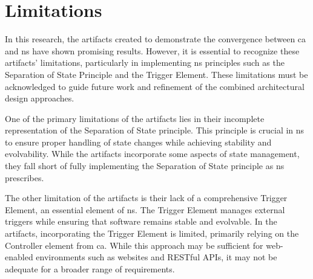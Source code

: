 \section{Limitations}

In this research, the artifacts created to demonstrate the convergence between \gls{ca}
and \gls{ns} have shown promising results. However, it is essential to recognize these
artifacts' limitations, particularly in implementing \gls{ns} principles such as the
Separation of State Principle and the Trigger Element. These limitations must be
acknowledged to guide future work and refinement of the combined architectural design
approaches.

One of the primary limitations of the artifacts lies in their incomplete representation of
the Separation of State principle. This principle is crucial in \gls{ns} to ensure proper
handling of state changes while achieving stability and evolvability. While the artifacts
incorporate some aspects of state management, they fall short of fully implementing the
Separation of State principle as \gls{ns} prescribes. 

The other limitation of the artifacts is their lack of a comprehensive Trigger Element, an
essential element of \gls{ns}. The Trigger Element manages external triggers while
ensuring that software remains stable and evolvable. In the artifacts, incorporating the
Trigger Element is limited, primarily relying on the Controller element from \gls{ca}.
While this approach may be sufficient for web-enabled environments such as websites and
RESTful APIs, it may not be adequate for a broader range of requirements.